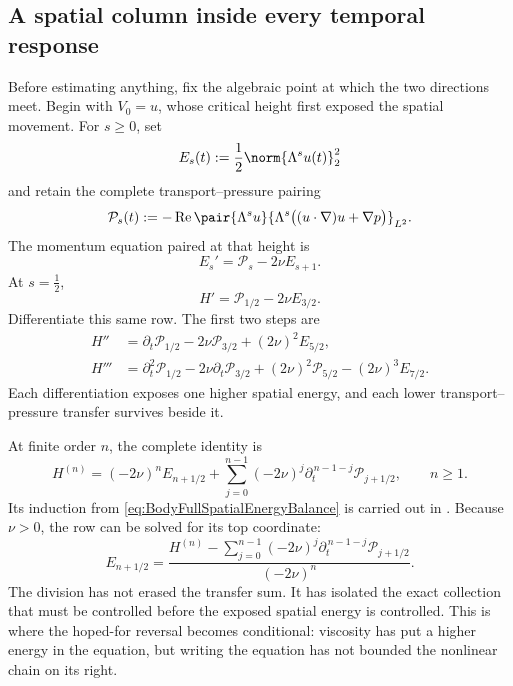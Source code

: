\subsection{A spatial column inside every temporal response}\label{sub:TheViscosityDrivenSpatialAscent}

Before estimating anything, fix the algebraic point at which the two directions
meet.  Begin with \(V_0=u\), whose critical height first exposed the spatial
movement.  For \(s\geq0\), set
\[
  E_s(t):=\frac12\norm{\Lambda^su(t)}_2^2
\]
and retain the complete transport--pressure pairing
\[
  \mathcal P_s(t)
  :=-
  \operatorname{Re}
  \pair{\Lambda^su}
  {\Lambda^s\bigl((u\cdot\nabla)u+\nabla p\bigr)}_{L^2}.
\]
The momentum equation paired at that height is
\begin{equation}\label{eq:BodyFullSpatialEnergyBalance}
  E_s'=\mathcal P_s-2\nu E_{s+1}.
\end{equation}
At \(s=\tfrac12\),
\begin{equation}\label{eq:BodyFirstCriticalRow}
  H'=\mathcal P_{1/2}-2\nu E_{3/2}.
\end{equation}
Differentiate this same row.  The first two steps are
\begin{align}
  H''
  &=\partial_t\mathcal P_{1/2}
  -2\nu\mathcal P_{3/2}
  +(2\nu)^2E_{5/2},
  \label{eq:BodySecondCriticalRow}\\
  H'''
  &=\partial_t^2\mathcal P_{1/2}
  -2\nu\partial_t\mathcal P_{3/2}
  +(2\nu)^2\mathcal P_{5/2}
  -(2\nu)^3E_{7/2}.
  \label{eq:BodyThirdCriticalRow}
\end{align}
Each differentiation exposes one higher spatial energy, and each lower
transport--pressure transfer survives beside it.

At finite order \(n\), the complete identity is
\begin{equation}\label{eq:BodyCriticalHeightSpatialAscent}
  H^{(n)}
  =(-2\nu)^nE_{n+1/2}
  +\sum_{j=0}^{n-1}
  (-2\nu)^j
  \partial_t^{\,n-1-j}\mathcal P_{j+1/2},
  \qquad n\geq1.
\end{equation}
Its induction from \eqref{eq:BodyFullSpatialEnergyBalance} is carried out in
.  Because \(\nu>0\), the row can be
solved for its top coordinate:
\begin{equation}\label{eq:BodyCompletedCriticalRow}
  E_{n+1/2}
  =\frac{
    H^{(n)}-
    \displaystyle\sum_{j=0}^{n-1}
    (-2\nu)^j\partial_t^{\,n-1-j}\mathcal P_{j+1/2}
  }{(-2\nu)^n}.
\end{equation}
The division has not erased the transfer sum.  It has isolated the exact
collection that must be controlled before the exposed spatial energy is
controlled.  This is where the hoped-for reversal becomes conditional:
viscosity has put a higher energy in the equation, but writing the equation has
not bounded the nonlinear chain on its right.

